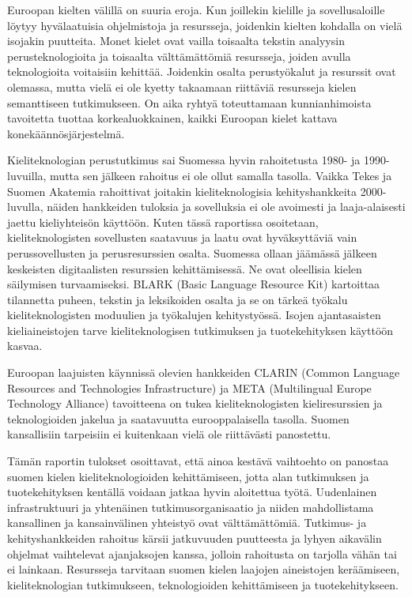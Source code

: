 \documentclass{../../metanetpaper}
\begin{document}
\begin{Parallel}[c]{79mm}{78mm}
{Euroopan kielten välillä on suuria eroja. Kun joillekin kielille ja
sovellusaloille löytyy hyvälaatuisia ohjelmistoja ja resursseja,
joidenkin kielten kohdalla on vielä isojakin puutteita. Monet kielet
ovat vailla toisaalta tekstin analyysin perusteknologioita ja
toisaalta välttämättömiä resursseja, joiden avulla teknologioita
voitaisiin kehittää. Joidenkin osalta perustyökalut ja resurssit ovat
olemassa, mutta vielä ei ole kyetty takaamaan riittäviä resursseja
kielen semanttiseen tutkimukseen. On aika ryhtyä toteuttamaan
kunnianhimoista tavoitetta tuottaa korkealuokkainen, kaikki Euroopan
kielet kattava konekäännösjärjestelmä.

Kieliteknologian perustutkimus sai Suomessa hyvin rahoitetusta 1980-
ja 1990-luvuilla, mutta sen jälkeen rahoitus ei ole ollut samalla
tasolla. Vaikka Tekes ja Suomen Akatemia rahoittivat joitakin
kieliteknologisia kehityshankkeita 2000-luvulla, näiden hankkeiden
tuloksia ja sovelluksia ei ole avoimesti ja laaja-alaisesti jaettu
kieliyhteisön käyttöön. Kuten tässä raportissa osoitetaan,
kieliteknologisten sovellusten saatavuus ja laatu ovat hyväksyttäviä
vain perussovellusten ja perusresurssien osalta. Suomessa ollaan
jäämässä jälkeen keskeisten digitaalisten resurssien
kehittämisessä. Ne ovat oleellisia kielen säilymisen
turvaamiseksi. BLARK (Basic Language Resource Kit) kartoittaa
tilannetta puheen, tekstin ja leksikoiden osalta ja se on tärkeä
työkalu kieliteknologisten moduulien ja työkalujen
kehitystyössä. Isojen ajantasaisten kieliaineistojen tarve
kieliteknologisen tutkimuksen ja tuotekehityksen käyttöön kasvaa.

Euroopan laajuisten käynnissä olevien hankkeiden CLARIN (Common
Language Resources and Technologies Infrastructure) ja META
(Multilingual Europe Technology Alliance) tavoitteena on tukea
kieliteknologisten kieliresurssien ja teknologioiden jakelua ja
saatavuutta eurooppalaisella tasolla. Suomen kansallisiin tarpeisiin
ei kuitenkaan vielä ole riittävästi panostettu.

Tämän raportin tulokset osoittavat, että ainoa kestävä vaihtoehto on
panostaa suomen kielen kieliteknologioiden kehittämiseen, jotta alan
tutkimuksen ja tuotekehityksen kentällä voidaan jatkaa hyvin
aloitettua työtä. Uudenlainen infrastruktuuri ja yhtenäinen
tutkimusorganisaatio ja niiden mahdollistama kansallinen ja
kansainvälinen yhteistyö ovat välttämättömiä. Tutkimus- ja
kehityshankkeiden rahoitus kärsii jatkuvuuden puutteesta ja lyhyen
aikavälin ohjelmat vaihtelevat ajanjaksojen kanssa, jolloin rahoitusta
on tarjolla vähän tai ei lainkaan. Resursseja tarvitaan suomen kielen
laajojen aineistojen keräämiseen, kieliteknologian tutkimukseen,
teknologioiden kehittämiseen ja tuotekehitykseen.

}
\end{Parallel}
\end{document}

